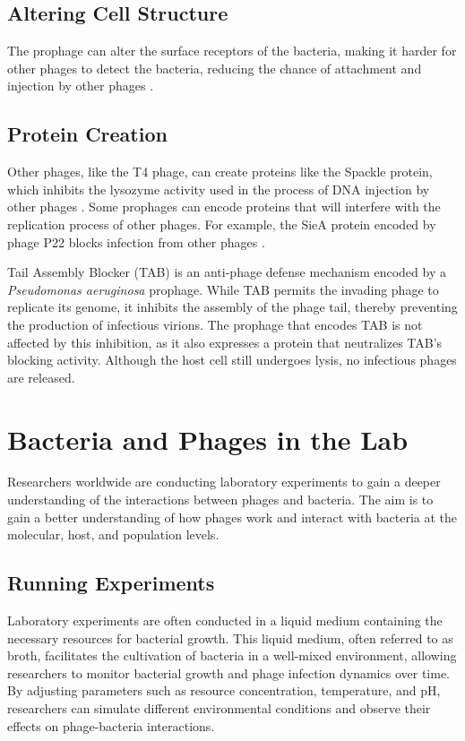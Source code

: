 \subsection{Altering Cell Structure}
The prophage can alter the surface receptors of the bacteria, making it harder for other phages to detect the bacteria, reducing the chance of attachment and injection by other phages \cite{bucherPhageMachineSIEence2024}. 

\subsection{Protein Creation}
Other phages, like the T4 phage, can create proteins like the Spackle protein, which inhibits the lysozyme activity used in the process of DNA injection by other phages \cite{bucherPhageMachineSIEence2024, kanamaruStructureFunctionT42020}. 
Some prophages can encode proteins that will interfere with the replication process of other phages. 
For example, the SieA protein encoded by phage P22 blocks infection from other phages \cite{leavittBacteriophageP22SieAmediated2024}. 

Tail Assembly Blocker (TAB) is an anti-phage defense mechanism encoded by a \textit{Pseudomonas aeruginosa} prophage. 
While TAB permits the invading phage to replicate its genome, it inhibits the assembly of the phage tail, thereby preventing the production of infectious virions. 
The prophage that encodes TAB is not affected by this inhibition, as it also expresses a protein that neutralizes TAB’s blocking activity. 
Although the host cell still undergoes lysis, no infectious phages are released.

\section{Bacteria and Phages in the Lab}
Researchers worldwide are conducting laboratory experiments to gain a deeper understanding of the interactions between phages and bacteria. 
The aim is to gain a better understanding of how phages work and interact with bacteria at the molecular, host, and population levels. 

\subsection{Running Experiments}
Laboratory experiments are often conducted in a liquid medium containing the necessary resources for bacterial growth. 
This liquid medium, often referred to as broth, facilitates the cultivation of bacteria in a well-mixed environment, allowing researchers to monitor bacterial growth and phage infection dynamics over time. 
By adjusting parameters such as resource concentration, temperature, and pH, researchers can simulate different environmental conditions and observe their effects on phage-bacteria interactions. 

